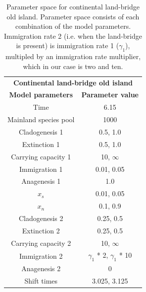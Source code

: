 \begin{table}[ht]
    \centering
    \caption{Parameter space for continental land-bridge old island. Parameter space consists of each combination of the model parameters. Immigration rate 2 (i.e. when the land-bridge is present) is immigration rate 1 ($\gamma_1$), multipled by an immigration rate multiplier, which in our case is two and ten.}
    \begin{tabular}{ c | c }
        \multicolumn{2}{c}{\textbf{Continental land-bridge old island}} \\
        \textbf{Model parameters} & \textbf{Parameter value} \\ 
        \hline
        \hline
        Time & 6.15 \\
        \hline
        Mainland species pool & 1000 \\
        \hline
        Cladogenesis 1 & 0.5, 1.0 \\
        \hline
        Extinction 1 & 0.5, 1.0 \\
        \hline
        Carrying capacity 1 & 10, $\infty$ \\
        \hline
        Immigration 1 & 0.01, 0.05 \\
        \hline
        Anagenesis 1 & 1.0 \\
        \hline
        $x_s$ & 0.01, 0.05 \\
        \hline
        $x_n$ & 0.1, 0.9 \\
        \hline
        Cladogenesis 2 & 0.25, 0.5 \\
        \hline
        Extinction 2 & 0.25, 0.5 \\
        \hline
        Carrying capacity 2 & 10, $\infty$ \\
        \hline
        Immigration 2 & $\gamma_1$ * 2, $\gamma_1$ * 10 \\ 
        \hline 
        Anagenesis 2 & 0 \\
        \hline
        Shift times & 3.025, 3.125 \\
    \end{tabular}
    \label{tab:continental_lb_old}
\end{table}

